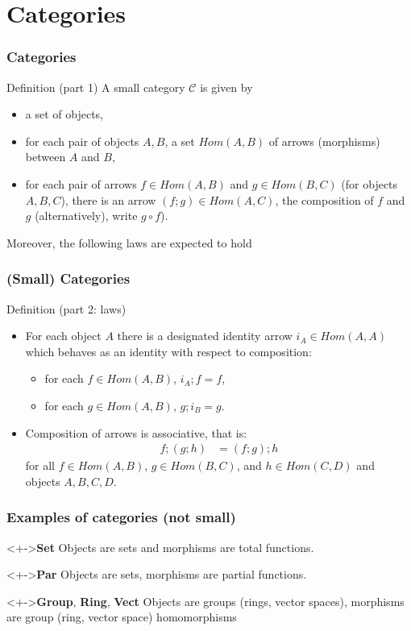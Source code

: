 \documentclass{beamer}
\begin{document}
\section{Categories}
\begin{frame}
  \frametitle{Categories}
  \begin{block}{Definition (part 1)}
    A \alert{small category} $\mathcal C$ is given by
    \begin{itemize}
    \item a set of \alert{objects},
    \item for each pair of objects $A,B$, a set $Hom(A,B)$ of
      \alert{arrows} (morphisms) between $A$ and $B$,
    \item for each pair of arrows $f \in Hom(A,B)$ and $g \in Hom (B,
      C)$ (for objects $A,B,C$), there is an arrow $(f;g) \in Hom (A,
      C)$, the \alert{composition} of $f$ and $g$ (alternatively), write
      $g\circ f$).
    \end{itemize}
    Moreover, the following laws are expected to hold
  \end{block}
\end{frame}
\begin{frame}
  \frametitle{(Small) Categories}
  \begin{block}{Definition (part 2: laws)}
    \begin{itemize}
    \item For each object $A$ there is a designated
      \alert{identity arrow} $i_A \in Hom (A,A) $ which behaves as an
      identity with respect to composition:
      \begin{itemize}
      \item for each $f \in Hom (A, B)$, $i_A;f = f$,
      \item for each $g \in Hom (A, B)$, $g; i_B = g$.
      \end{itemize}
    \item Composition of arrows is associative, that is:
      \begin{align*}
        f; (g; h) &= (f; g); h
      \end{align*}
      for all $f \in Hom (A, B)$, $g \in Hom (B, C)$, and $h \in Hom
      (C, D)$ and objects $A,B,C,D$.
    \end{itemize}
  \end{block}
\end{frame}
\begin{frame}
  \frametitle{Examples of categories (not small)}
  \begin{block}<+->{\textbf{Set}}
    Objects are sets and morphisms are total functions. 
  \end{block}
  \begin{block}<+->{\textbf{Par}}
    Objects are sets, morphisms are partial functions.
  \end{block}
  \begin{block}<+->{\textbf{Group}, \textbf{Ring}, \textbf{Vect}}
    Objects are groups (rings, vector spaces), morphisms are group
    (ring, vector space) homomorphisms
  \end{block}
\end{frame}
\end{document}
